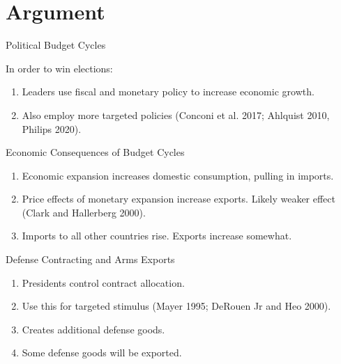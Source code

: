\documentclass[12pt]{beamer}
\begin{document}

\section{Argument} 


\begin{frame}{Political Budget Cycles}

In order to win elections:
\pause 
\begin{enumerate} 
\item Leaders use fiscal and monetary policy to increase economic growth. 
\pause 
\item Also employ more targeted policies (Conconi et al. 2017; Ahlquist 2010, Philips 2020). 
\end{enumerate}


\end{frame} 


\begin{frame}{Economic Consequences of Budget Cycles}

\pause 
\begin{enumerate} 
\item Economic expansion increases domestic consumption, pulling in imports.  
\pause 
\item Price effects of monetary expansion increase exports. Likely weaker effect (Clark and Hallerberg 2000). 
\pause
\item Imports to all other countries rise. Exports increase somewhat. 
\end{enumerate}


\end{frame} 


\begin{frame}{Defense Contracting and Arms Exports}

\pause 
\begin{enumerate} 
\item Presidents control contract allocation.  
\pause 
\item Use this for targeted stimulus (Mayer 1995; DeRouen Jr and Heo 2000).
\pause
\item Creates additional defense goods.
\pause
\item Some defense goods will be exported.
\end{enumerate}


\end{frame} 
\end{document}
